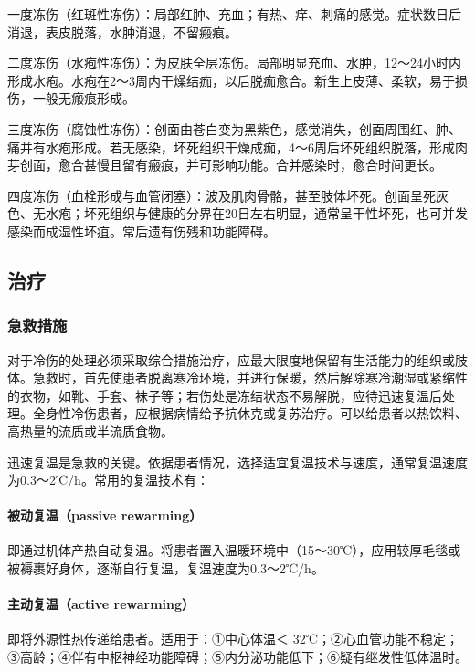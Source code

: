 一度冻伤（红斑性冻伤）：局部红肿、充血；有热、痒、刺痛的感觉。症状数日后消退，表皮脱落，水肿消退，不留瘢痕。

二度冻伤（水疱性冻伤）：为皮肤全层冻伤。局部明显充血、水肿，12～24小时内形成水疱。水疱在2～3周内干燥结痂，以后脱痂愈合。新生上皮薄、柔软，易于损伤，一般无瘢痕形成。

三度冻伤（腐蚀性冻伤）：创面由苍白变为黑紫色，感觉消失，创面周围红、肿、痛并有水疱形成。若无感染，坏死组织干燥成痂，4～6周后坏死组织脱落，形成肉芽创面，愈合甚慢且留有瘢痕，并可影响功能。合并感染时，愈合时间更长。

四度冻伤（血栓形成与血管闭塞）：波及肌肉骨骼，甚至肢体坏死。创面呈死灰色、无水疱；坏死组织与健康的分界在20日左右明显，通常呈干性坏死，也可并发感染而成湿性坏疽。常后遗有伤残和功能障碍。

\subsection{治疗}

\subsubsection{急救措施}

对于冷伤的处理必须采取综合措施治疗，应最大限度地保留有生活能力的组织或肢体。急救时，首先使患者脱离寒冷环境，并进行保暖，然后解除寒冷潮湿或紧缩性的衣物，如靴、手套、袜子等；若伤处是冻结状态不易解脱，应待迅速复温后处理。全身性冷伤患者，应根据病情给予抗休克或复苏治疗。可以给患者以热饮料、高热量的流质或半流质食物。

迅速复温是急救的关键。依据患者情况，选择适宜复温技术与速度，通常复温速度为0.3～2℃/h。常用的复温技术有：

\paragraph{被动复温（passive rewarming）}

即通过机体产热自动复温。将患者置入温暖环境中（15～30℃），应用较厚毛毯或被褥裹好身体，逐渐自行复温，复温速度为0.3～2℃/h。

\paragraph{主动复温（active rewarming）}

即将外源性热传递给患者。适用于：①中心体温＜
32℃；②心血管功能不稳定；③高龄；④伴有中枢神经功能障碍；⑤内分泌功能低下；⑥疑有继发性低体温时。

